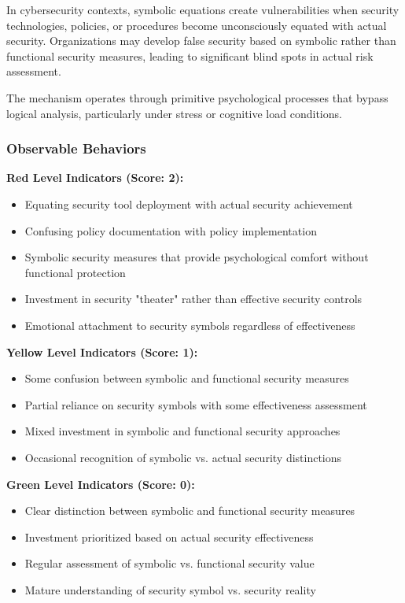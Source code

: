 \documentclass[11pt,a4paper]{article}
\begin{document}
In cybersecurity contexts, symbolic equations create vulnerabilities when security technologies, policies, or procedures become unconsciously equated with actual security. Organizations may develop false security based on symbolic rather than functional security measures, leading to significant blind spots in actual risk assessment.

The mechanism operates through primitive psychological processes that bypass logical analysis, particularly under stress or cognitive load conditions\cite{bion1962}.

\subsubsection{Observable Behaviors}

\textbf{Red Level Indicators (Score: 2):}
\begin{itemize}
\item Equating security tool deployment with actual security achievement
\item Confusing policy documentation with policy implementation
\item Symbolic security measures that provide psychological comfort without functional protection
\item Investment in security "theater" rather than effective security controls
\item Emotional attachment to security symbols regardless of effectiveness
\end{itemize}

\textbf{Yellow Level Indicators (Score: 1):}
\begin{itemize}
\item Some confusion between symbolic and functional security measures
\item Partial reliance on security symbols with some effectiveness assessment
\item Mixed investment in symbolic and functional security approaches
\item Occasional recognition of symbolic vs. actual security distinctions
\end{itemize}

\textbf{Green Level Indicators (Score: 0):}
\begin{itemize}
\item Clear distinction between symbolic and functional security measures
\item Investment prioritized based on actual security effectiveness
\item Regular assessment of symbolic vs. functional security value
\item Mature understanding of security symbol vs. security reality
\end{itemize}
\end{document}
